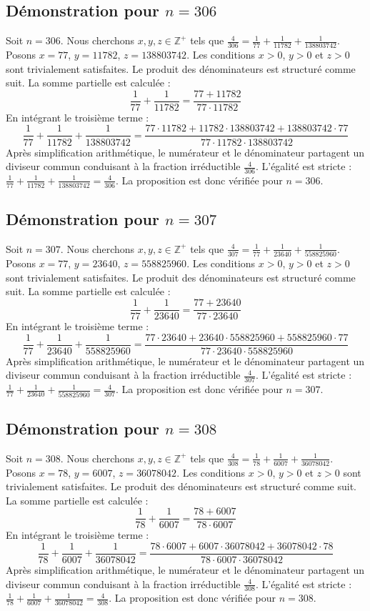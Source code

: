 \documentclass[11pt,a4paper]{article}
\begin{document}
\subsection{Démonstration pour $n = 306$}
Soit $n = 306$. Nous cherchons $x, y, z \in \mathbb{Z}^{+}$ tels que $\frac{4}{306} = \frac{1}{77} + \frac{1}{11782} + \frac{1}{138803742}$.
Posons $x = 77$, $y = 11782$, $z = 138803742$.
Les conditions $x > 0$, $y > 0$ et $z > 0$ sont trivialement satisfaites.
Le produit des dénominateurs est structuré comme suit. La somme partielle est calculée :
$$ \frac{1}{77} + \frac{1}{11782} = \frac{77+11782}{77 \cdot 11782} $$
En intégrant le troisième terme :
$$ \frac{1}{77} + \frac{1}{11782} + \frac{1}{138803742} = \frac{77 \cdot 11782 + 11782 \cdot 138803742 + 138803742 \cdot 77}{77 \cdot 11782 \cdot 138803742} $$
Après simplification arithmétique, le numérateur et le dénominateur partagent un diviseur commun conduisant à la fraction irréductible $\frac{4}{306}$.
L'égalité est stricte : $\frac{1}{77} + \frac{1}{11782} + \frac{1}{138803742} = \frac{4}{306}$.
La proposition est donc vérifiée pour $n = 306$.
\subsection{Démonstration pour $n = 307$}
Soit $n = 307$. Nous cherchons $x, y, z \in \mathbb{Z}^{+}$ tels que $\frac{4}{307} = \frac{1}{77} + \frac{1}{23640} + \frac{1}{558825960}$.
Posons $x = 77$, $y = 23640$, $z = 558825960$.
Les conditions $x > 0$, $y > 0$ et $z > 0$ sont trivialement satisfaites.
Le produit des dénominateurs est structuré comme suit. La somme partielle est calculée :
$$ \frac{1}{77} + \frac{1}{23640} = \frac{77+23640}{77 \cdot 23640} $$
En intégrant le troisième terme :
$$ \frac{1}{77} + \frac{1}{23640} + \frac{1}{558825960} = \frac{77 \cdot 23640 + 23640 \cdot 558825960 + 558825960 \cdot 77}{77 \cdot 23640 \cdot 558825960} $$
Après simplification arithmétique, le numérateur et le dénominateur partagent un diviseur commun conduisant à la fraction irréductible $\frac{4}{307}$.
L'égalité est stricte : $\frac{1}{77} + \frac{1}{23640} + \frac{1}{558825960} = \frac{4}{307}$.
La proposition est donc vérifiée pour $n = 307$.
\subsection{Démonstration pour $n = 308$}
Soit $n = 308$. Nous cherchons $x, y, z \in \mathbb{Z}^{+}$ tels que $\frac{4}{308} = \frac{1}{78} + \frac{1}{6007} + \frac{1}{36078042}$.
Posons $x = 78$, $y = 6007$, $z = 36078042$.
Les conditions $x > 0$, $y > 0$ et $z > 0$ sont trivialement satisfaites.
Le produit des dénominateurs est structuré comme suit. La somme partielle est calculée :
$$ \frac{1}{78} + \frac{1}{6007} = \frac{78+6007}{78 \cdot 6007} $$
En intégrant le troisième terme :
$$ \frac{1}{78} + \frac{1}{6007} + \frac{1}{36078042} = \frac{78 \cdot 6007 + 6007 \cdot 36078042 + 36078042 \cdot 78}{78 \cdot 6007 \cdot 36078042} $$
Après simplification arithmétique, le numérateur et le dénominateur partagent un diviseur commun conduisant à la fraction irréductible $\frac{4}{308}$.
L'égalité est stricte : $\frac{1}{78} + \frac{1}{6007} + \frac{1}{36078042} = \frac{4}{308}$.
La proposition est donc vérifiée pour $n = 308$.
\end{document}
